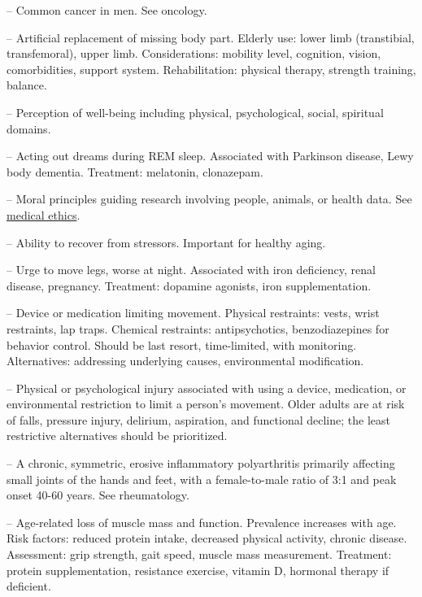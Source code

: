 -- Common cancer in men. See oncology.

-- Artificial replacement of missing body part. Elderly use: lower limb (transtibial, transfemoral), upper limb. Considerations: mobility level, cognition, vision, comorbidities, support system. Rehabilitation: physical therapy, strength training, balance.

-- Perception of well-being including physical, psychological, social, spiritual domains.

-- Acting out dreams during REM sleep. Associated with Parkinson disease, Lewy body dementia. Treatment: melatonin, clonazepam.

-- Moral principles guiding research involving people, animals, or health data. See \hyperlink{Medical Ethics}{medical ethics}.

-- Ability to recover from stressors. Important for healthy aging.

-- Urge to move legs, worse at night. Associated with iron deficiency, renal disease, pregnancy. Treatment: dopamine agonists, iron supplementation.

-- Device or medication limiting movement. Physical restraints: vests, wrist restraints, lap traps. Chemical restraints: antipsychotics, benzodiazepines for behavior control. Should be last resort, time-limited, with monitoring. Alternatives: addressing underlying causes, environmental modification.

-- Physical or psychological injury associated with using a device, medication, or environmental restriction to limit a person's movement. Older adults are at risk of falls, pressure injury, delirium, aspiration, and functional decline; the least restrictive alternatives should be prioritized.

-- A chronic, symmetric, erosive inflammatory polyarthritis primarily affecting small joints of the hands and feet, with a female-to-male ratio of 3:1 and peak onset 40-60 years. See rheumatology.

-- Age-related loss of muscle mass and function. Prevalence increases with age. Risk factors: reduced protein intake, decreased physical activity, chronic disease. Assessment: grip strength, gait speed, muscle mass measurement. Treatment: protein supplementation, resistance exercise, vitamin D, hormonal therapy if deficient.

